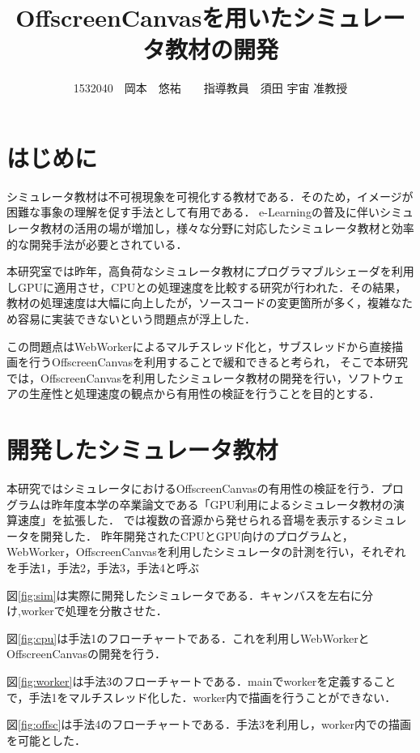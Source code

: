 \documentclass[twocolumn,10pt,a4j]{jsarticle}
\title{OffscreenCanvasを用いたシミュレータ教材の開発}
\author{1532040　岡本　悠祐　　指導教員　須田 宇宙 准教授}
\date{}
\begin{document}
\maketitle
\section{はじめに}
シミュレータ教材は不可視現象を可視化する教材である．そのため，イメージが困難な事象の理解を促す手法として有用である．
e-Learningの普及に伴いシミュレータ教材の活用の場が増加し，様々な分野に対応したシミュレータ教材と効率的な開発手法が必要とされている．

本研究室では昨年，高負荷なシミュレータ教材にプログラマブルシェーダを利用しGPUに適用させ，CPUとの処理速度を比較する研究が行われた．その結果，教材の処理速度は大幅に向上したが，ソースコードの変更箇所が多く，複雑なため容易に実装できないという問題点が浮上した．

この問題点はWebWorkerによるマルチスレッド化と，サブスレッドから直接描画を行うOffscreenCanvasを利用することで緩和できると考られ，
そこで本研究では，OffscreenCanvasを利用したシミュレータ教材の開発を行い，ソフトウェアの生産性と処理速度の観点から有用性の検証を行うことを目的とする．

\section{開発したシミュレータ教材}
本研究ではシミュレータにおけるOffscreenCanvasの有用性の検証を行う．プログラムは昨年度本学の卒業論文である「GPU利用によるシミュレータ教材の演算速度」を拡張した\cite{book}．
\cite{book}では複数の音源から発せられる音場を表示するシミュレータを開発した．
昨年開発されたCPUとGPU向けのプログラムと，WebWorker，OffscreenCanvasを利用したシミュレータの計測を行い，それぞれを手法1，手法2，手法3，手法4と呼ぶ

図\ref{fig:sim}は実際に開発したシミュレータである．キャンバスを左右に分け,workerで処理を分散させた．

図\ref{fig:cpu}は手法1のフローチャートである．これを利用しWebWorkerとOffscreenCanvasの開発を行う．

図\ref{fig:worker}は手法3のフローチャートである．mainでworkerを定義することで，手法1をマルチスレッド化した．worker内で描画を行うことができない．

図\ref{fig:offsc}は手法4のフローチャートである．手法3を利用し，worker内での描画を可能とした．
\end{document}
